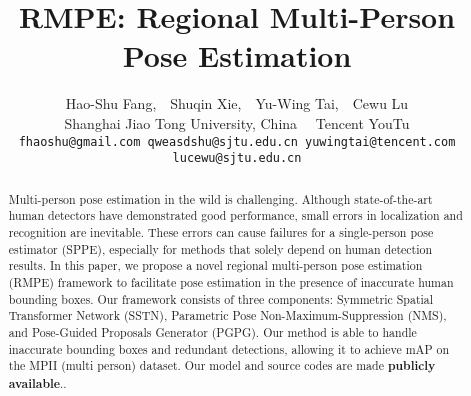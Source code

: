 \documentclass[10pt,twocolumn,letterpaper]{article}
\begin{document}
\title{RMPE: Regional Multi-Person Pose Estimation}

\author{Hao-Shu Fang\footnotemark[1],~~Shuqin Xie,~~Yu-Wing Tai,~~Cewu Lu\footnotemark[4]\\
Shanghai Jiao Tong University, China~~ Tencent YouTu\\
{\tt\small fhaoshu@gmail.com qweasdshu@sjtu.edu.cn yuwingtai@tencent.com lucewu@sjtu.edu.cn}}


\maketitle
\renewcommand{\thefootnote}{\fnsymbol{footnote}}
\begin{abstract}
Multi-person pose estimation in the wild is challenging. Although state-of-the-art human detectors have demonstrated good performance, small errors in localization and recognition are inevitable. These errors can cause failures for a single-person pose estimator (SPPE), especially for methods that solely depend on human detection results. In this paper, we propose a novel regional multi-person pose estimation (RMPE) framework to facilitate pose estimation in the presence of inaccurate human bounding boxes. Our framework consists of three components: Symmetric Spatial Transformer Network (SSTN), Parametric Pose Non-Maximum-Suppression (NMS), and Pose-Guided Proposals Generator (PGPG). Our method is able to handle inaccurate bounding boxes and redundant detections, allowing it to achieve  mAP on the MPII (multi person) dataset\cite{andriluka14cvpr}. Our model and source codes are made \textbf{publicly available}.\footnotemark[2].
\end{abstract}
\end{document}
